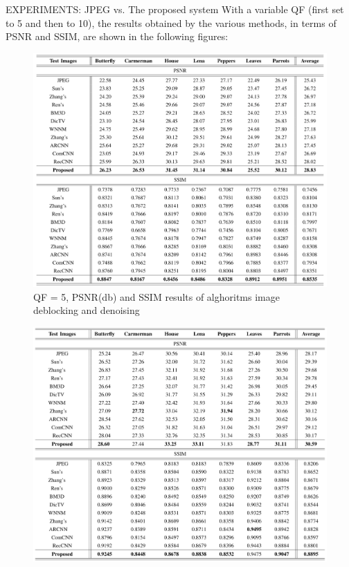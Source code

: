 \begin{frame}{EXPERIMENTS: JPEG vs. The proposed system}
    With a variable QF (first set to 5 and then to 10), the results obtained by 
    the various methods, in terms of PSNR and SSIM, are shown in the following figures:
    \begin{minipage}{\linewidth}
        \centering
        \begin{minipage}{0.45\linewidth}
            \begin{figure}[H]
                \includegraphics[width = 1 \linewidth]{images/paper3/comparison.png}
                \caption{QF = 5, PSNR(db) and SSIM results of alghoritms image deblocking and denoising}
            \end{figure}
        \end{minipage}
        \hspace{0.05\linewidth}
        \begin{minipage}{0.45\linewidth}
            \begin{figure}[htbp]
                \centering
                \includegraphics[width = 1 \linewidth]{images/paper3/comparison2.png}

\end{figure}
\end{minipage}
\end{minipage}
\end{frame}
